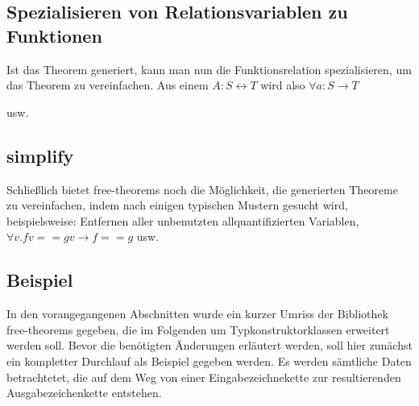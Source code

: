 

\subsection{Spezialisieren von Relationsvariablen zu Funktionen}

Ist das Theorem generiert, kann man nun die Funktionsrelation spezialisieren, um das Theorem zu vereinfachen. Aus einem
$A : S \leftrightarrow T$ wird also $\forall a : S \rightarrow T$

usw.


\subsection{simplify}

Schließlich bietet free-theorems noch die Möglichkeit, die generierten Theoreme zu vereinfachen, indem nach einigen typischen
Mustern gesucht wird, beispielsweise: Entfernen aller unbenutzten allquantifizierten Variablen, $\forall v. f v == g v \rightarrow f == g$ usw.


\subsection{Beispiel}

In den vorangegangenen Abschnitten wurde ein kurzer Umriss der Bibliothek free-theorems gegeben, die im Folgenden um
Typkonstruktorklassen erweitert werden soll. Bevor die benötigten Änderungen erläutert werden, soll hier zunächst ein
kompletter Durchlauf als Beispiel gegeben werden. Es werden sämtliche Daten betrachtetet, die auf dem Weg von einer
Eingabezeichnekette zur resultierenden Ausgabezeichenkette entstehen.

